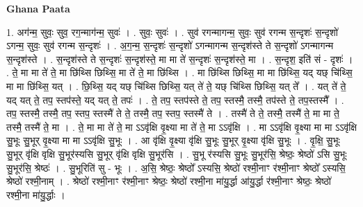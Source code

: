 \documentclass[17pt]{extarticle}
\begin{document}
\textbf{Ghana Paata } \newline

1. अग॑न्म॒ सुवः॒ सुव॒ रग॒न्माग॑न्म॒ सुवः॑ । . सुवः॒ सुवः॑ । . सुव॑ रगन्मागन्म॒ सुवः॒ सुव॑ रगन्म स॒न्दृशः॑ स॒न्दृशो॑ ऽगन्म॒ सुवः॒ सुव॑ रगन्म स॒न्दृशः॑ । . अ॒ग॒न्म॒ स॒न्दृशः॑ स॒न्दृशो॑ ऽगन्मागन्म स॒न्दृश॑स्ते ते स॒न्दृशो॑ ऽगन्मागन्म स॒न्दृश॑स्ते । . स॒न्दृश॑स्ते ते स॒न्दृशः॑ स॒न्दृश॑स्ते॒ मा मा ते॑ स॒न्दृशः॑ स॒न्दृश॑स्ते॒ मा । . स॒न्दृश॒ इति॑ सं - दृशः॑ । . ते॒ मा मा ते॑ ते॒ मा छि॑थ्सि छिथ्सि॒ मा ते॑ ते॒ मा छि॑थ्सि । . मा छि॑थ्सि छिथ्सि॒ मा मा छि॑थ्सि॒ यद् यछ् चि॑थ्सि॒ मा मा छि॑थ्सि॒ यत् । . छि॒थ्सि॒ यद् यछ् चि॑थ्सि छिथ्सि॒ यत् ते॑ ते॒ यछ् चि॑थ्सि छिथ्सि॒ यत् ते᳚ । . यत् ते॑ ते॒ यद् यत् ते॒ तप॒ स्तप॑स्ते॒ यद् यत् ते॒ तपः॑ । . ते॒ तप॒ स्तप॑स्ते ते॒ तप॒ स्तस्मै॒ तस्मै॒ तप॑स्ते ते॒ तप॒स्तस्मै᳚ । . तप॒ स्तस्मै॒ तस्मै॒ तप॒ स्तप॒ स्तस्मै॑ ते ते॒ तस्मै॒ तप॒ स्तप॒ स्तस्मै॑ ते । . तस्मै॑ ते ते॒ तस्मै॒ तस्मै॑ ते॒ मा मा ते॒ तस्मै॒ तस्मै॑ ते॒ मा । . ते॒ मा मा ते॑ ते॒ मा ऽऽवृ॑क्षि वृ॒क्ष्या मा ते॑ ते॒ मा ऽऽवृ॑क्षि । . मा ऽऽवृ॑क्षि वृ॒क्ष्या मा मा ऽऽवृ॑क्षि सु॒भूः सु॒भूर् वृ॒क्ष्या मा मा ऽऽवृ॑क्षि सु॒भूः । . आ वृ॑क्षि वृ॒क्ष्या वृ॑क्षि सु॒भूः सु॒भूर् वृ॒क्ष्या वृ॑क्षि सु॒भूः । . वृ॒क्षि॒ सु॒भूः सु॒भूर् वृ॑क्षि वृक्षि सु॒भूर॑स्यसि सु॒भूर् वृ॑क्षि वृक्षि सु॒भूर॑सि । . सु॒भू र॑स्यसि सु॒भूः सु॒भूर॑सि॒ श्रेष्ठः॒ श्रेष्ठो॑ ऽसि सु॒भूः सु॒भूर॑सि॒ श्रेष्ठः॑ । . सु॒भूरिति॑ सु - भूः । . अ॒सि॒ श्रेष्ठः॒ श्रेष्ठो᳚ ऽस्यसि॒ श्रेष्ठो॑ रश्मी॒नाꣳ र॑श्मी॒नाꣳ श्रेष्ठो᳚ ऽस्यसि॒ श्रेष्ठो॑ रश्मी॒नाम् । . श्रेष्ठो॑ रश्मी॒नाꣳ र॑श्मी॒नाꣳ श्रेष्ठः॒ श्रेष्ठो॑ रश्मी॒ना मा॑यु॒र्द्धा आ॑यु॒र्द्धा र॑श्मी॒नाꣳ श्रेष्ठः॒ श्रेष्ठो॑ रश्मी॒ना मा॑यु॒र्द्धाः । \newline
\end{document}
